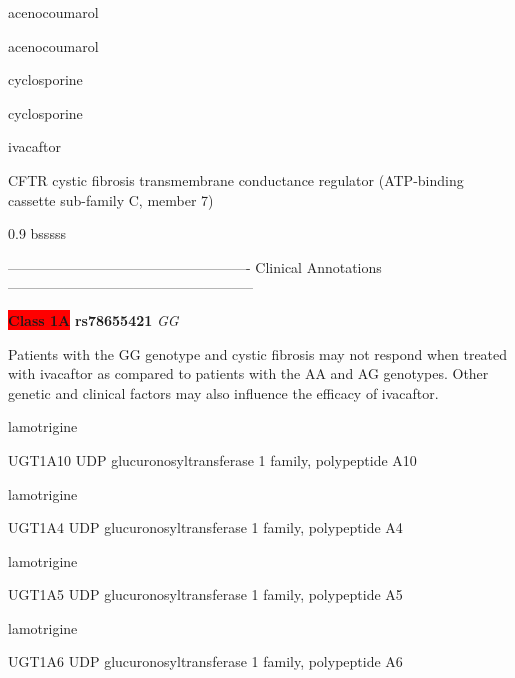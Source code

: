 \documentclass{resume} %
\begin{document}
\begin{rSection}{ acenocoumarol }
\begin{rSection}{ acenocoumarol }
\begin{rSection}{ cyclosporine }
\begin{rSection}{ cyclosporine }
\begin{rSection}{ ivacaftor }
\begin{rSubsection}{ CFTR }{ cystic fibrosis transmembrane conductance regulator (ATP-binding cassette sub-family C, member 7) }{}{}
\begin{center}
\begin{tabularx}{0.9\textwidth}{ bsssss }
\\
		\end{tabularx}
		\end{center}
		\normalsize
		\vspace{10pt}
		        
\item[] ---------------------------------------------------- Clinical Annotations -----------------------------------------------------\newline
\item \textbf{\colorbox{red} {Class 1A}} \textbf{ rs78655421 } \textit{ GG }
\item[] Patients with the GG genotype and cystic fibrosis may not respond when treated with ivacaftor as compared to patients with the AA and AG genotypes. Other genetic and clinical factors may also influence the efficacy of ivacaftor.

\end{rSubsection}

\end{rSection}\begin{rSection}{ lamotrigine }
\item[]
\begin{rSubsection}{ UGT1A10 }{ UDP glucuronosyltransferase 1 family, polypeptide A10 }{}{}
\item[]


\end{rSubsection}\begin{rSection}{ lamotrigine }
\item[]
\begin{rSubsection}{ UGT1A4 }{ UDP glucuronosyltransferase 1 family, polypeptide A4 }{}{}
\item[]


\end{rSubsection}\begin{rSection}{ lamotrigine }
\item[]
\begin{rSubsection}{ UGT1A5 }{ UDP glucuronosyltransferase 1 family, polypeptide A5 }{}{}
\item[]


\end{rSubsection}\begin{rSection}{ lamotrigine }
\item[]
\begin{rSubsection}{ UGT1A6 }{ UDP glucuronosyltransferase 1 family, polypeptide A6 }{}{}
\item[]



\end{rSubsection}
\end{rSection}
\end{rSection}
\end{rSection}
\end{rSection}
\end{rSection}
\end{rSection}
\end{rSection}
\end{rSection}
\end{document}
